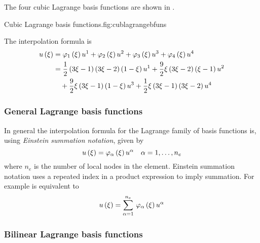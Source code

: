 The four \onedal cubic Lagrange basis functions are shown in .

{Cubic Lagrange basis functions.}{fig:cublagrangebfuns}

The interpolation formula is
\begin{equation}
  \begin{split}
     u\left( \xi \right) &=   \varphi_{1} \left( \xi \right)   {u}^{1} +   \varphi_{2} \left( \xi \right)   {u}^{2} +
       \varphi_{3} \left( \xi \right)   {u}^{3} +   \varphi_{4} \left( \xi \right)   {u}^{4} \\
    &=\frac12\left( 3\xi-1 \right)\left( 3\xi-2 \right)\left( 1-\xi \right) {u}^{1} +
    \frac92\xi\left( 3\xi-2 \right)\left( \xi-1 \right) {u}^{2}  \\
    &\quad+\frac92\xi\left( 3\xi-1 \right)\left( 1-\xi \right) {u}^{3} +
    \frac12\xi\left( 3\xi-1 \right)\left( 3\xi-2 \right) {u}^{4} 
  \end{split}
\end{equation}

\subsubsection{General Lagrange basis functions}

In general the interpolation formula for the Lagrange family of basis
functions is, using \emph{Einstein
  summation notation}, given by
\begin{equation}
   u\left( \xi \right) =   \varphi_{\alpha} \left( \xi \right)   {u}^{\alpha} \quad \alpha=1,\ldots,n_{e}
  \label{eqn:lagrangeinterpolation}
\end{equation}
where $n_{e}$ is the number of local nodes in the element. Einstein summation
notation uses a repeated index in a product expression to imply summation. For
example  is equivalent to
\begin{equation}
   u\left( \xi \right) =  \displaystyle\sum_{\alpha=1}^{n_{e}} \,   \varphi_{\alpha} \left( \xi \right)   {u}^{\alpha}  
\end{equation}

\subsubsection{Bilinear Lagrange basis functions}

